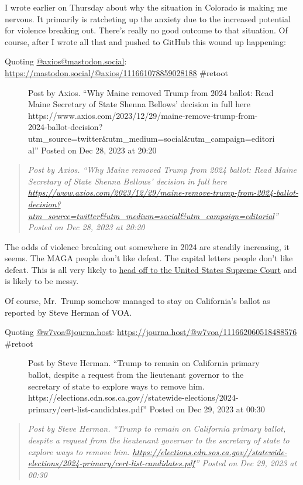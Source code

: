 I wrote earlier on Thursday about why the situation in Colorado is
making me nervous. It primarily is ratcheting up the anxiety due to the
increased potential for violence breaking out. There's really no good
outcome to that situation. Of course, after I wrote all that and pushed
to GitHub this wound up happening:

Quoting \href{https://mastodon.social/@axios}{@axios@mastodon.social}:
\url{https://mastodon.social/@axios/111661078859028188} \#retoot

\begin{figure}
\centering
{}
\caption{Post by Axios. ``Why Maine removed Trump from 2024 ballot: Read
Maine Secretary of State Shenna Bellows' decision in full here
https://www.axios.com/2023/12/29/maine-remove-trump-from-2024-ballot-decision?utm\_source=twitter\&utm\_medium=social\&utm\_campaign=editorial''
Posted on Dec 28, 2023 at 20:20}
\end{figure}

\begin{quote}
\emph{Post by Axios. ``Why Maine removed Trump from 2024 ballot: Read
Maine Secretary of State Shenna Bellows' decision in full here
\url{https://www.axios.com/2023/12/29/maine-remove-trump-from-2024-ballot-decision?utm_source=twitter&utm_medium=social&utm_campaign=editorial}''
Posted on Dec 28, 2023 at 20:20}
\end{quote}

The odds of violence breaking out somewhere in 2024 are steadily
increasing, it seems. The MAGA people don't like defeat. The capital
letters people don't like defeat. This is all very likely to
\href{https://web.archive.org/web/20231229054349/https://electionlawblog.org/?p=140477}{head
off to the United States Supreme Court} and is likely to be messy.

Of course, Mr.~Trump somehow managed to stay on California's ballot as
reported by Steve Herman of VOA.

Quoting \href{https://journa.host/@w7voa/}{@w7voa@journa.host}:
\url{https://journa.host/@w7voa/111662060518488576} \#retoot

\begin{figure}
\centering
{}
\caption{Post by Steve Herman. ``Trump to remain on California primary
ballot, despite a request from the lieutenant governor to the secretary
of state to explore ways to remove him.
https://elections.cdn.sos.ca.gov//statewide-elections/2024-primary/cert-list-candidates.pdf''
Posted on Dec 29, 2023 at 00:30}
\end{figure}

\begin{quote}
\emph{Post by Steve Herman. ``Trump to remain on California primary
ballot, despite a request from the lieutenant governor to the secretary
of state to explore ways to remove him.
\url{https://elections.cdn.sos.ca.gov//statewide-elections/2024-primary/cert-list-candidates.pdf}''
Posted on Dec 29, 2023 at 00:30}
\end{quote}
